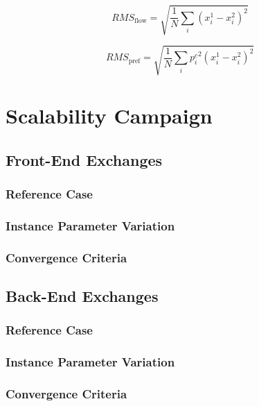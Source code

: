 \begin{equation}\label{eqn:rms_flow}
RMS_{\text{flow}} = \sqrt{ \frac{1}{N} \sum_i (x^1_i - x^2_i) ^2 }
\end{equation}

\begin{equation}\label{eqn:rms_pref}
RMS_{\text{pref}} = \sqrt{ \frac{1}{N} \sum_i {p_i^c}^2 (x^1_i - x^2_i)^2 }
\end{equation}

\section{Scalability Campaign}\label{results:scale}

\subsection{Front-End Exchanges}

\subsubsection{Reference Case}

\subsubsection{Instance Parameter Variation}

\subsubsection{Convergence Criteria}

\subsection{Back-End Exchanges}

\subsubsection{Reference Case}

\subsubsection{Instance Parameter Variation}

\subsubsection{Convergence Criteria}

